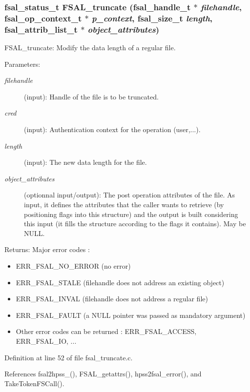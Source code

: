\subsubsection{\setlength{\rightskip}{0pt plus 5cm}fsal\_\-status\_\-t FSAL\_\-truncate (fsal\_\-handle\_\-t $\ast$ {\em filehandle}, fsal\_\-op\_\-context\_\-t $\ast$ {\em p\_\-context}, fsal\_\-size\_\-t {\em length}, fsal\_\-attrib\_\-list\_\-t $\ast$ {\em object\_\-attributes})}\label{fsal__truncate_8c_a0}


FSAL\_\-truncate: Modify the data length of a regular file.

\begin{Desc}
\item[Parameters:]
\begin{description}
\item[{\em filehandle}](input): Handle of the file is to be truncated. \item[{\em cred}](input): Authentication context for the operation (user,...). \item[{\em length}](input): The new data length for the file. \item[{\em object\_\-attributes}](optionnal input/output): The post operation attributes of the file. As input, it defines the attributes that the caller wants to retrieve (by positioning flags into this structure) and the output is built considering this input (it fills the structure according to the flags it contains). May be NULL.\end{description}
\end{Desc}
\begin{Desc}
\item[Returns:]Major error codes :\begin{itemize}
\item ERR\_\-FSAL\_\-NO\_\-ERROR (no error)\item ERR\_\-FSAL\_\-STALE (filehandle does not address an existing object)\item ERR\_\-FSAL\_\-INVAL (filehandle does not address a regular file)\item ERR\_\-FSAL\_\-FAULT (a NULL pointer was passed as mandatory argument)\item Other error codes can be returned : ERR\_\-FSAL\_\-ACCESS, ERR\_\-FSAL\_\-IO, ... \end{itemize}
\end{Desc}


Definition at line 52 of file fsal\_\-truncate.c.

References fsal2hpss\_(), FSAL\_\-getattrs(), hpss2fsal\_\-error(), and Take\-Token\-FSCall().